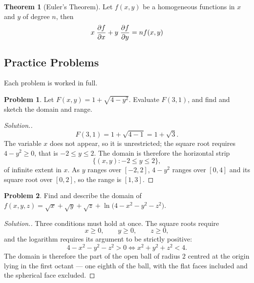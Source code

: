 \documentclass[11pt,a4paper]{article}
\theoremstyle{definition}
\newtheorem{thm}{Theorem}[subsection]
\newtheorem{problemx}{Problem}[subsection]
\newenvironment{problem}{\begin{problemx}}{\end{problemx}}
\newenvironment{solution}
  {\renewcommand{\qedsymbol}{}\begin{proof}[\textit{Solution}.]}
  {\end{proof}}
\begin{document}
\begin{thm}[Euler's Theorem]


Let $f(x,y)$ be a homogeneous functions in $x$ and $y$ of degree $n$, then $$x\hspace{0.1cm}\dfrac{\partial f}{\partial x} + y \hspace{0.1cm}\dfrac{\partial f}{\partial y} = n f(x,y)$$

\pagebreak
\end{thm}

\subsection{Practice Problems}

Each problem is worked in full.

\begin{problem}
Let $F(x,y) = 1+\sqrt{4-y^2}$. Evaluate $F(3,1)$, and find and sketch the domain
and range.
\end{problem}
\begin{solution}
$$F(3,1) = 1+\sqrt{4-1} = 1+\sqrt3 .$$
The variable $x$ does not appear, so it is unrestricted; the square root
requires $4-y^2\geq 0$, that is $-2\leq y\leq 2$. The domain is therefore the
horizontal strip
$$\big\{(x,y): -2\leq y\leq 2\big\},$$
of infinite extent in $x$. As $y$ ranges over $[-2,2]$, $4-y^2$ ranges over
$[0,4]$ and its square root over $[0,2]$, so the range is $[1,3]$.
\end{solution}

\begin{problem}
Find and describe the domain of
$f(x,y,z) = \sqrt x + \sqrt y + \sqrt z + \ln\big(4-x^2-y^2-z^2\big)$.
\end{problem}
\begin{solution}
Three conditions must hold at once. The square roots require
$$x\geq 0,\qquad y\geq 0,\qquad z\geq 0 ,$$
and the logarithm requires its argument to be strictly positive:
$$4-x^2-y^2-z^2 > 0 \iff x^2+y^2+z^2 < 4 .$$
The domain is therefore the part of the open ball of radius $2$ centred at the
origin lying in the first octant --- one eighth of the ball, with the flat
faces included and the spherical face excluded.
\end{solution}
\end{document}
